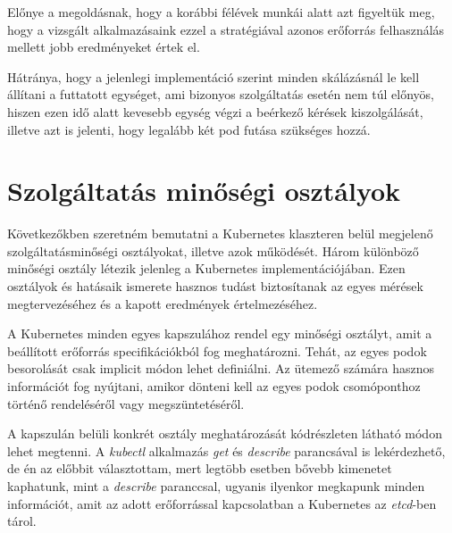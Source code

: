 Előnye a megoldásnak, hogy a korábbi félévek munkái alatt azt figyeltük meg, hogy a vizsgált alkalmazásaink ezzel a stratégiával azonos erőforrás felhasználás mellett jobb eredményeket értek el.\citep{bscThesis} 

Hátránya, hogy a jelenlegi implementáció szerint minden skálázásnál le kell állítani a futtatott egységet, ami bizonyos szolgáltatás esetén nem túl előnyös, hiszen ezen idő alatt kevesebb egység végzi a beérkező kérések kiszolgálását, illetve azt is jelenti, hogy legalább két pod futása szükséges hozzá.




\section{Szolgáltatás minőségi osztályok}

Következőkben szeretném bemutatni a Kubernetes klaszteren belül megjelenő szolgáltatásminőségi osztályokat, illetve azok működését.
Három különböző minőségi osztály létezik jelenleg a Kubernetes implementációjában\citep{KubernetesQoSClasses}. 
Ezen osztályok és hatásaik ismerete hasznos tudást biztosítanak az egyes mérések megtervezéséhez és a kapott eredmények értelmezéséhez.

A Kubernetes minden egyes kapszulához rendel egy minőségi osztályt, amit a beállított erőforrás specifikációkból fog meghatározni.
Tehát, az egyes podok besorolását csak implicit módon lehet definiálni.
Az ütemező számára hasznos információt fog nyújtani, amikor dönteni kell az egyes podok csomóponthoz történő rendeléséről vagy megszüntetéséről.

A kapszulán belüli konkrét osztály meghatározását  kódrészleten látható módon lehet megtenni.
A \textit{kubectl} alkalmazás \textit{get} és \textit{describe} parancsával is lekérdezhető, de én az előbbit választottam, mert legtöbb esetben bővebb kimenetet kaphatunk, mint a \textit{describe} paranccsal, ugyanis ilyenkor megkapunk minden információt, amit az adott erőforrással kapcsolatban a Kubernetes az \textit{etcd}-ben tárol.

